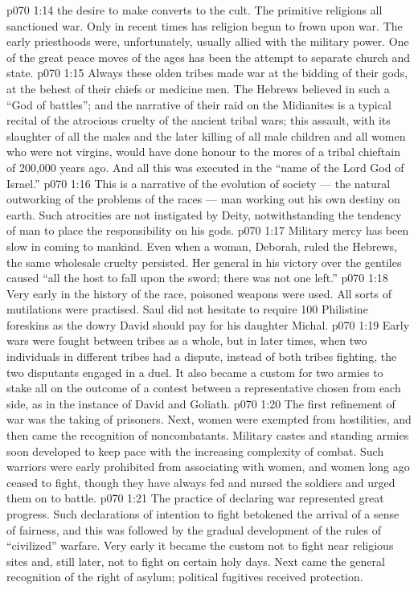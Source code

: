\vs p070 1:14 \bibnobreakspace {} the desire to make converts to the cult. The primitive religions all sanctioned war. Only in recent times has religion begun to frown upon war. The early priesthoods were, unfortunately, usually allied with the military power. One of the great peace moves of the ages has been the attempt to separate church and state.
\vs p070 1:15 \pc Always these olden tribes made war at the bidding of their gods, at the behest of their chiefs or medicine men. The Hebrews believed in such a “God of battles”; and the narrative of their raid on the Midianites is a typical recital of the atrocious cruelty of the ancient tribal wars; this assault, with its slaughter of all the males and the later killing of all male children and all women who were not virgins, would have done honour to the mores of a tribal chieftain of 200,000 years ago. And all this was executed in the “name of the Lord God of Israel.”
\vs p070 1:16 This is a narrative of the evolution of society --- the natural outworking of the problems of the races --- man working out his own destiny on earth. Such atrocities are not instigated by Deity, notwithstanding the tendency of man to place the responsibility on his gods.
\vs p070 1:17 \pc Military mercy has been slow in coming to mankind. Even when a woman, Deborah, ruled the Hebrews, the same wholesale cruelty persisted. Her general in his victory over the gentiles caused “all the host to fall upon the sword; there was not one left.”
\vs p070 1:18 Very early in the history of the race, poisoned weapons were used. All sorts of mutilations were practised. Saul did not hesitate to require 100 Philistine foreskins as the dowry David should pay for his daughter Michal.
\vs p070 1:19 Early wars were fought between tribes as a whole, but in later times, when two individuals in different tribes had a dispute, instead of both tribes fighting, the two disputants engaged in a duel. It also became a custom for two armies to stake all on the outcome of a contest between a representative chosen from each side, as in the instance of David and Goliath.
\vs p070 1:20 The first refinement of war was the taking of prisoners. Next, women were exempted from hostilities, and then came the recognition of noncombatants. Military castes and standing armies soon developed to keep pace with the increasing complexity of combat. Such warriors were early prohibited from associating with women, and women long ago ceased to fight, though they have always fed and nursed the soldiers and urged them on to battle.
\vs p070 1:21 The practice of declaring war represented great progress. Such declarations of intention to fight betokened the arrival of a sense of fairness, and this was followed by the gradual development of the rules of “civilized” warfare. Very early it became the custom not to fight near religious sites and, still later, not to fight on certain holy days. Next came the general recognition of the right of asylum; political fugitives received protection.
